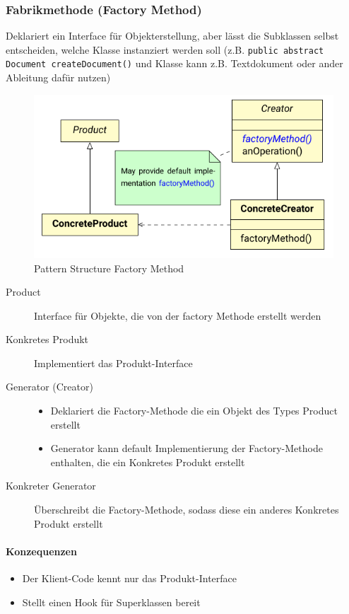 \documentclass[ngerman,color=3b]{tuda_summary}
\begin{document}
\clearpage
\subsubsection{Fabrikmethode (Factory Method)}
\begin{definition}
    Deklariert ein Interface für Objekterstellung, aber lässt die Subklassen selbst entscheiden, welche Klasse instanziert werden soll (z.B. \texttt{public abstract Document createDocument()} und Klasse kann z.B. Textdokument oder ander Ableitung dafür nutzen)
\end{definition}
\begin{figure}[ht]
    \centering
    \includegraphics[width=.5\textwidth]{bilder/factory_method_pattern.pdf}
    \caption{Pattern Structure Factory Method}
\end{figure}
\FloatBarrier
\begin{description}
    \item[Product] Interface für Objekte, die von der factory Methode erstellt werden
    \item[Konkretes Produkt] Implementiert das Produkt-Interface
    \item[Generator (Creator)] \begin{itemize}
              \item Deklariert die Factory-Methode die ein Objekt des Types Product erstellt
              \item Generator kann default Implementierung der Factory-Methode enthalten, die ein Konkretes Produkt erstellt
          \end{itemize}
    \item[Konkreter Generator] Überschreibt die Factory-Methode, sodass diese ein anderes Konkretes Produkt erstellt
\end{description}
\paragraph{Konzequenzen}
\begin{itemize}
    \item Der Klient-Code kennt nur das Produkt-Interface
    \item Stellt einen Hook für Superklassen bereit
\end{itemize}
\end{document}
